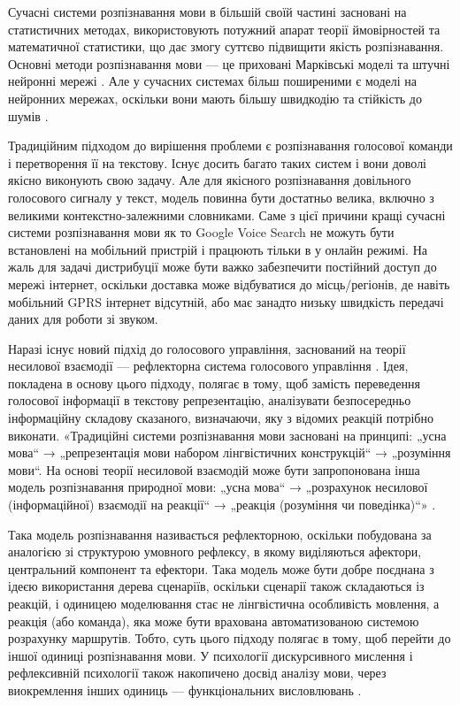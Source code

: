 Сучасні системи розпізнавання мови в більшій своїй частині засновані на статистичних методах, використовують потужний апарат теорії ймовірностей та математичної статистики, що дає змогу суттєво підвищити якість розпізнавання. Основні методи розпізнавання мови — це приховані Марківські моделі та штучні нейронні мережі \cite{Makovkin_2006, Gefke_2012}. Але у сучасних системах більш поширеними є моделі на нейронних мережах, оскільки вони мають більшу швидкодію та стійкість до шумів \cite{Hinton_2012}.

Традиційним підходом до вирішення проблеми є розпізнавання голосової команди і перетворення її на текстову. Існує досить багато таких систем і вони доволі якісно виконують свою задачу. Але для якісного розпізнавання довільного голосового сигналу у текст, модель повинна бути достатньо велика, включно з великими контекстно-залежними словниками. Саме з цієї причини кращі сучасні системи розпізнавання мови як то Google Voice Search не можуть бути встановлені на мобільний пристрій і працюють тільки в у онлайн режимі. На жаль для задачі дистрибуції може бути важко забезпечити постійний доступ до мережі інтернет, оскільки доставка може відбуватися до місць/регіонів, де навіть мобільний GPRS інтернет відсутній, або має занадто низьку швидкість передачі даних для роботи зі звуком.

Наразі існує новий підхід до голосового управління, заснований на теорії несилової взаємодії \cite{Teslia_2010} — рефлекторна система голосового управління \cite{Egorchenkov_2016}. Ідея, покладена в основу цього підходу, полягає в тому, щоб замість переведення голосової інформації в текстову репрезентацію, аналізувати безпосередньо інформаційну складову сказаного, визначаючи, яку з відомих реакцій потрібно виконати. «Традиційні системи розпізнавання мови засновані на принципі: „усна мова“ → „репрезентація мови набором лінгвістичних конструкцій“ → „розуміння мови“. На основі теорії несиловой взаємодій може бути запропонована інша модель розпізнавання природної мови: „усна мова“ → „розрахунок несилової (інформаційної) взаємодії на реакції“ → „реакція (розуміння чи поведінка)“» \cite{Teslia_2014}.

Така модель розпізнавання називається рефлекторною, оскільки побудована за аналогією зі структурою умовного рефлексу, в якому виділяються афектори, центральний компонент та ефектори. Така модель може бути добре поєднана з ідеєю використання дерева сценаріїв, оскільки сценарії також складаються із реакцій, і одиницею моделювання стає не лінгвістична особливість мовлення, а реакція (або команда), яка може бути врахована автоматизованою системою розрахунку маршрутів. Тобто, суть цього підходу полягає в тому, щоб перейти до іншої одиниці розпізнавання мови. У психології дискурсивного мислення і рефлексивній психології також накопичено досвід аналізу мови, через виокремлення інших одиниць — функціональних висловлювань \cite{Naydonov_2008}.

